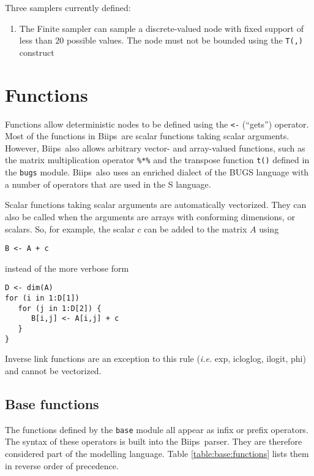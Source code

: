 \documentclass[11pt, a4paper, titlepage]{report}
\newcommand{\biips}{\textsf{Biips}}
\begin{document}
Three samplers currently defined:
\begin{enumerate}
\item The Finite sampler can sample a discrete-valued node with
fixed support of less than 20 possible values. The node must not
be bounded using the \verb+T(,)+ construct
\end{enumerate}

\chapter{Functions}
\label{section:functions}

Functions allow deterministic nodes to be defined using the \verb+<-+
(``gets'') operator.  Most of the functions in \biips\ are scalar
functions taking scalar arguments. However, \biips\ also allows
arbitrary vector- and array-valued functions, such as the matrix
multiplication operator \verb+%*%+ and the transpose function
\verb+t()+ defined in the \verb+bugs+ module.
\biips\ also uses an enriched dialect of the BUGS language with
a number of operators that are used in the S language.

Scalar functions taking scalar arguments are automatically vectorized.
They can also be called when the arguments are arrays with conforming
dimensions, or scalars. So, for example, the scalar $c$ can be added to
the matrix $A$ using
\begin{verbatim}
B <- A + c
\end{verbatim}
instead of the more verbose form
\begin{verbatim}
D <- dim(A)
for (i in 1:D[1])
   for (j in 1:D[2]) {
      B[i,j] <- A[i,j] + c
   }
}
\end{verbatim}
Inverse link functions are an exception to this rule ({\em i.e.} exp,
icloglog, ilogit, phi) and cannot be vectorized. 

\section{Base functions}
\label{section:functions:base}

The functions defined by the \verb+base+ module all appear as infix or
prefix operators. The syntax of these operators is built into the
\biips\ parser. They are therefore considered part of the modelling
language.  Table \ref{table:base:functions} lists them in reverse
order of precedence.
\end{document}
